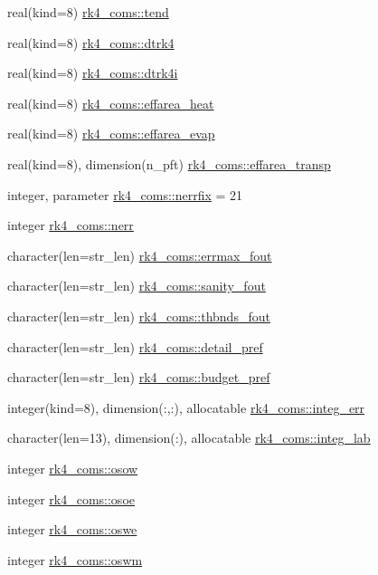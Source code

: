 \begin{DoxyCompactItemize}
\item 
real(kind=8) \hyperlink{namespacerk4__coms_a489d1f63edd639eb7a5c248163b59f9b}{rk4\+\_\+coms\+::tend}
\item 
real(kind=8) \hyperlink{namespacerk4__coms_affa4e03ec127e7def8035b8b32bdb5b8}{rk4\+\_\+coms\+::dtrk4}
\item 
real(kind=8) \hyperlink{namespacerk4__coms_a987c7ccf90cfcf40c2a925b2c1057404}{rk4\+\_\+coms\+::dtrk4i}
\item 
real(kind=8) \hyperlink{namespacerk4__coms_af575cfc8fb0e2063e1d3a08be26aea3a}{rk4\+\_\+coms\+::effarea\+\_\+heat}
\item 
real(kind=8) \hyperlink{namespacerk4__coms_aae531dd6ba4cf10a03c3fad2b61071bb}{rk4\+\_\+coms\+::effarea\+\_\+evap}
\item 
real(kind=8), dimension(n\+\_\+pft) \hyperlink{namespacerk4__coms_aa9b9a7fcec09aad8a6d3423c30c3b1de}{rk4\+\_\+coms\+::effarea\+\_\+transp}
\item 
integer, parameter \hyperlink{namespacerk4__coms_a8f0596202fc6dc04e70e600a544ae155}{rk4\+\_\+coms\+::nerrfix} = 21
\item 
integer \hyperlink{namespacerk4__coms_a8e2fcadf9c0fe34be391e95bd3caa31c}{rk4\+\_\+coms\+::nerr}
\item 
character(len=str\+\_\+len) \hyperlink{namespacerk4__coms_af90527ec55879335bb58710234142b14}{rk4\+\_\+coms\+::errmax\+\_\+fout}
\item 
character(len=str\+\_\+len) \hyperlink{namespacerk4__coms_a673279a49daaa7f21ade0992c6fe0c0d}{rk4\+\_\+coms\+::sanity\+\_\+fout}
\item 
character(len=str\+\_\+len) \hyperlink{namespacerk4__coms_ab106d324ed571335ee763dd190e7430d}{rk4\+\_\+coms\+::thbnds\+\_\+fout}
\item 
character(len=str\+\_\+len) \hyperlink{namespacerk4__coms_acd58047348a9b1ff25ec1afda9163705}{rk4\+\_\+coms\+::detail\+\_\+pref}
\item 
character(len=str\+\_\+len) \hyperlink{namespacerk4__coms_a2da1f732b9648b485c93d62814060cf2}{rk4\+\_\+coms\+::budget\+\_\+pref}
\item 
integer(kind=8), dimension(\+:,\+:), allocatable \hyperlink{namespacerk4__coms_aecab6dfff0aaea0938b5c59d550860bc}{rk4\+\_\+coms\+::integ\+\_\+err}
\item 
character(len=13), dimension(\+:), allocatable \hyperlink{namespacerk4__coms_a4f5c8dc79c821a459a356f283b4831c8}{rk4\+\_\+coms\+::integ\+\_\+lab}
\item 
integer \hyperlink{namespacerk4__coms_ac28f34645e6cd2065bc8c458ae43f642}{rk4\+\_\+coms\+::osow}
\item 
integer \hyperlink{namespacerk4__coms_a62d65ed745bfd02b36c79be5861b7cee}{rk4\+\_\+coms\+::osoe}
\item 
integer \hyperlink{namespacerk4__coms_ae9733bb77416a4d137c65ddd1adc5c23}{rk4\+\_\+coms\+::oswe}
\item 
integer \hyperlink{namespacerk4__coms_a588b443c0107fd03a7642394a2df5cc9}{rk4\+\_\+coms\+::oswm}
\end{DoxyCompactItemize}
